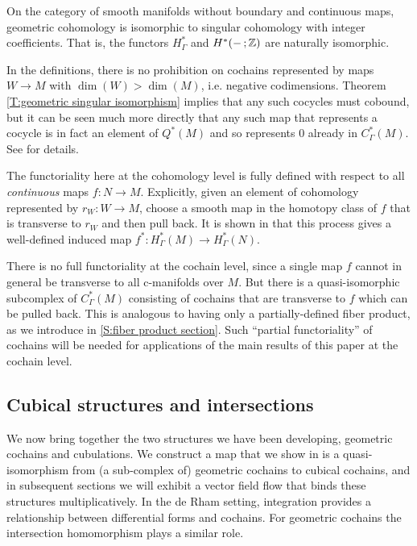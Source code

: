 \begin{theorem}\label{T:geometric singular isomorphism}
	On the category of smooth manifolds without boundary and continuous maps, geometric cohomology is isomorphic to singular cohomology with integer coefficients.
	That is, the functors $H^*_\Gamma$ and $H^*(- \,;\mathbb{Z})$ are naturally isomorphic.
\end{theorem}

\begin{remark}
	In the definitions, there is no prohibition on cochains represented by maps $W \to M$ with $\dim(W) > \dim(M)$, i.e. negative codimensions.
	Theorem \cref{T:geometric singular isomorphism} implies that any such cocycles must cobound, but it can be seen much more directly that any such map that represents a cocycle is in fact an element of $Q^*(M)$ and so represents $0$ already in $C^*_\Gamma(M)$.
	See \cite[Example 4.23]{medina2022foundations} for details.
\end{remark}

The functoriality here at the cohomology level is fully defined with respect to all \textit{continuous} maps $f \colon N \to M$.
Explicitly, given an element of cohomology represented by $r_W \colon W \to M$, choose a smooth map in the homotopy class of $f$ that is transverse to $r_W$ and then pull back.
It is shown in \cite[Proposition 5.16]{medina2022foundations} that this process gives a well-defined induced map $f^* \colon H^*_\Gamma(M) \to H^*_\Gamma(N)$.

There is no full functoriality at the cochain level, since a single map $f$ cannot in general be transverse to all c-manifolds over $M$.
But there is a quasi-isomorphic subcomplex of $C_\Gamma^*(M)$ consisting of cochains that are transverse to $f$ which can be pulled back.
This is analogous to having only a partially-defined fiber product, as we introduce in \cref{S:fiber product section}.
Such ``partial functoriality'' of cochains will be needed for applications of the main results of this paper at the cochain level.

\subsection{Cubical structures and intersections}

We now bring together the two structures we have been developing, geometric cochains and cubulations.
We construct a map that we show in \cite{medina2022foundations} is a quasi-isomorphism from (a sub-complex of) geometric cochains to cubical cochains, and in subsequent sections we will exhibit a vector field flow that binds these structures multiplicatively.
In the de Rham setting, integration provides a relationship between differential forms and cochains.
For geometric cochains the intersection homomorphism plays a similar role.

